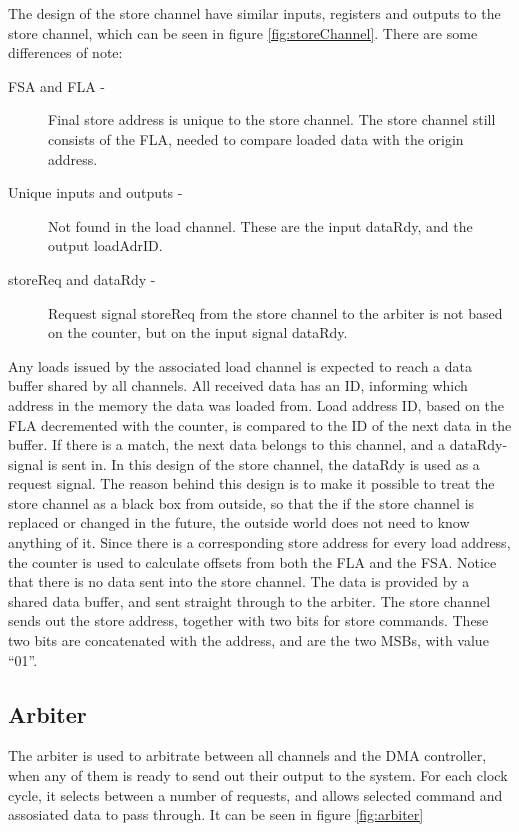 \begin{appendix}
The design of the store channel have similar inputs, registers and outputs to the store channel, which can be seen in figure \ref{fig:storeChannel}.
There are some differences of note:
\begin{description}
    \item[FSA and FLA -]
    Final store address is unique to the store channel.
    The store channel still consists of the FLA, needed to compare loaded data with the origin address.
    \item[Unique inputs and outputs -]
    Not found in the load channel.
    These are the input dataRdy, and the output loadAdrID.
    \item[storeReq and dataRdy -]
    Request signal storeReq from the store channel to the arbiter is not based on the counter, but on the input signal dataRdy.
\end{description}

Any loads issued by the associated load channel is expected to reach a data buffer shared by all channels.
All received data has an ID, informing which address in the memory the data was loaded from.
Load address ID, based on the FLA decremented with the counter, is compared to the ID of the next data in the buffer.
If there is a match, the next data belongs to this channel, and a dataRdy-signal is sent in.
In this design of the store channel, the dataRdy is used as a request signal.
The reason behind this design is to make it possible to treat the store channel as a black box from outside, so that the if the store channel is replaced or changed in the future, the outside world does not need to know anything of it.
Since there is a corresponding store address for every load address, the counter is used to calculate offsets from both the FLA and the FSA.
Notice that there is no data sent into the store channel.
The data is provided by a shared data buffer, and sent straight through to the arbiter.
The store channel sends out the store address, together with two bits for store commands.
These two bits are concatenated with the address, and are the two MSBs, with value ``01''.

\subsection{Arbiter}
The arbiter is used to arbitrate between all channels and the DMA controller, when any of them is ready to send out their output to the system.
For each clock cycle, it selects between a number of requests, and allows selected command and assosiated data to pass through.
It can be seen in figure \ref{fig:arbiter}


\end{appendix}
